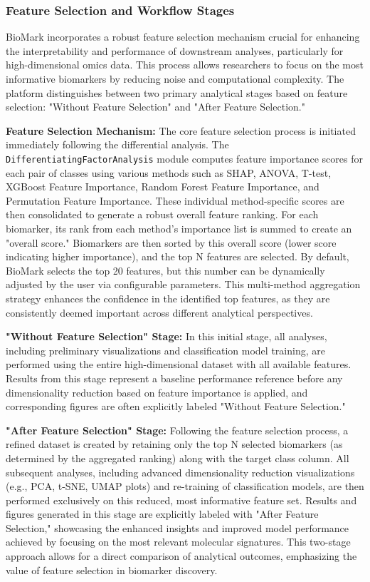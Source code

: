 \documentclass[journal]{IEEEtran}
\begin{document}
\subsubsection{Feature Selection and Workflow Stages}\label{sec:feature_selection_mechanism_label}
BioMark incorporates a robust feature selection mechanism crucial for enhancing the interpretability and performance of downstream analyses, particularly for high-dimensional omics data. This process allows researchers to focus on the most informative biomarkers by reducing noise and computational complexity. The platform distinguishes between two primary analytical stages based on feature selection: "Without Feature Selection" and "After Feature Selection."

\textbf{Feature Selection Mechanism:}
The core feature selection process is initiated immediately following the differential analysis. The \texttt{DifferentiatingFactorAnalysis} module computes feature importance scores for each pair of classes using various methods such as SHAP, ANOVA, T-test, XGBoost Feature Importance, Random Forest Feature Importance, and Permutation Feature Importance. These individual method-specific scores are then consolidated to generate a robust overall feature ranking. For each biomarker, its rank from each method's importance list is summed to create an "overall score." Biomarkers are then sorted by this overall score (lower score indicating higher importance), and the top N features are selected. By default, BioMark selects the top 20 features, but this number can be dynamically adjusted by the user via configurable parameters. This multi-method aggregation strategy enhances the confidence in the identified top features, as they are consistently deemed important across different analytical perspectives.

\textbf{"Without Feature Selection" Stage:}
In this initial stage, all analyses, including preliminary visualizations and classification model training, are performed using the entire high-dimensional dataset with all available features. Results from this stage represent a baseline performance reference before any dimensionality reduction based on feature importance is applied, and corresponding figures are often explicitly labeled "Without Feature Selection."

\textbf{"After Feature Selection" Stage:}
Following the feature selection process, a refined dataset is created by retaining only the top N selected biomarkers (as determined by the aggregated ranking) along with the target class column. All subsequent analyses, including advanced dimensionality reduction visualizations (e.g., PCA, t-SNE, UMAP plots) and re-training of classification models, are then performed exclusively on this reduced, most informative feature set. Results and figures generated in this stage are explicitly labeled with "After Feature Selection," showcasing the enhanced insights and improved model performance achieved by focusing on the most relevant molecular signatures. This two-stage approach allows for a direct comparison of analytical outcomes, emphasizing the value of feature selection in biomarker discovery.
\end{document}
